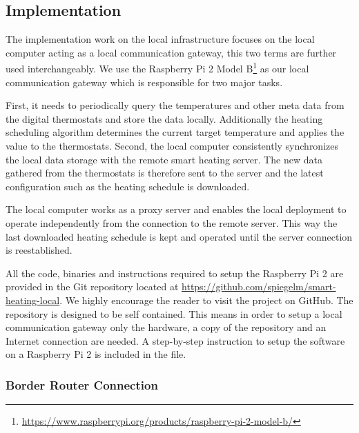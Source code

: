 \subsection{Implementation}
\label{sec:local_infrastructure_implementation}

The implementation work on the local infrastructure focuses on the local computer acting as a local communication gateway, this two terms are further used interchangeably.
We use the Raspberry Pi 2 Model B\footnote{\url{https://www.raspberrypi.org/products/raspberry-pi-2-model-b/}} as our local communication gateway which is responsible for two major tasks.

First, it needs to periodically query the temperatures and other meta data from the digital thermostats and store the data locally.
Additionally the heating scheduling algorithm determines the current target temperature and applies the value to the thermostats.
Second, the local computer consistently synchronizes the local data storage with the remote smart heating server.
The new data gathered from the thermostats is therefore sent to the server and the latest configuration such as the heating schedule is downloaded.

The local computer works as a proxy server and enables the local deployment to operate independently from the connection to the remote server.
This way the last downloaded heating schedule is kept and operated until the server connection is reestablished.


All the code, binaries and instructions required to setup the Raspberry Pi 2 are provided in the Git repository located at \url{https://github.com/spiegelm/smart-heating-local}.
We highly encourage the reader to visit the project on GitHub.
The repository is designed to be self contained.
This means in order to setup a local communication gateway only the hardware, a copy of the repository and an Internet connection are needed.
A step-by-step instruction to setup the software on a Raspberry Pi 2 is included in the  file.

\subsubsection{Border Router Connection}

